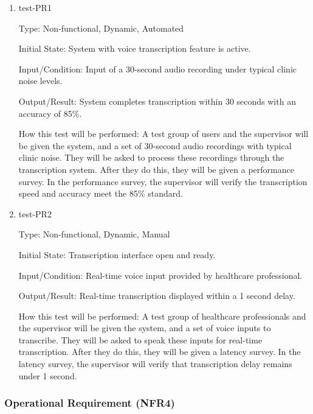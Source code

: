 \documentclass[12pt, titlepage]{article}
\begin{document}
\begin{enumerate}
    \item{test-PR1} \label{test-PR1}
    
    Type: Non-functional, Dynamic, Automated
    
    Initial State: System with voice transcription feature is active.
    
    Input/Condition: Input of a 30-second audio recording under typical clinic noise levels.
    
    Output/Result: System completes transcription within 30 seconds with an accuracy of 85\%.
    
    How this test will be performed: A test group of users and the supervisor will be given the system, and a set of 30-second audio recordings with typical clinic noise. They will be asked to process these recordings through the transcription system. After they do this, they will be given a performance survey. In the performance survey, the supervisor will verify the transcription speed and accuracy meet the 85\% standard.

    \item{test-PR2} \label{test-PR2}
    
    Type: Non-functional, Dynamic, Manual
    
    Initial State: Transcription interface open and ready.
    
    Input/Condition: Real-time voice input provided by healthcare professional.
    
    Output/Result: Real-time transcription displayed within a 1 second delay.
    
    How this test will be performed: A test group of healthcare professionals and the supervisor will be given the system, and a set of voice inputs to transcribe. They will be asked to speak these inputs for real-time transcription. After they do this, they will be given a latency survey. In the latency survey, the supervisor will verify that transcription delay remains under 1 second.
\end{enumerate}

\subsubsection{Operational Requirement (NFR4)} \label{section:4.2.4}
\end{document}
